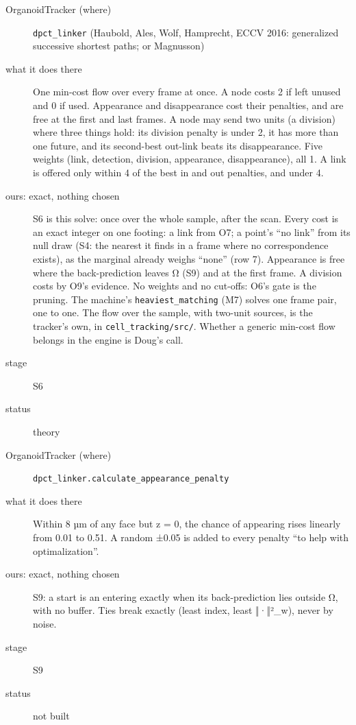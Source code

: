 \begin{description}
\item[{OrganoidTracker (where)}] \texttt{dpct\_\allowbreak{}linker} (Haubold, Ales, Wolf, Hamprecht, ECCV 2016: generalized successive shortest paths; or Magnusson)
\item[{what it does there}] One min-cost flow over every frame at once. A node costs 2 if left unused and 0 if used. Appearance and disappearance cost their penalties, and are free at the first and last frames. A node may send two units (a division) where three things hold: its division penalty is under 2, it has more than one future, and its second-best out-link beats its disappearance. Five weights (link, detection, division, appearance, disappearance), all 1. A link is offered only within 4 of the best in and out penalties, and under 4.
\item[{ours: exact, nothing chosen}] S6 is this solve: once over the whole sample, after the scan. Every cost is an exact integer on one footing: a link from O7; a point's “no link” from its null draw (S4: the nearest it finds in a frame where no correspondence exists), as the marginal already weighs “none” (row 7). Appearance is free where the back-prediction leaves Ω (S9) and at the first frame. A division costs by O9's evidence. No weights and no cut-offs: O6's gate is the pruning. The machine's \texttt{heaviest\_\allowbreak{}matching} (M7) solves one frame pair, one to one. The flow over the sample, with two-unit sources, is the tracker's own, in \texttt{cell\_\allowbreak{}tracking/\allowbreak{}src/\allowbreak{}}. Whether a generic min-cost flow belongs in the engine is Doug's call.
\item[{stage}] S6
\item[{status}] theory
\end{description}

\begin{description}
\item[{OrganoidTracker (where)}] \texttt{dpct\_\allowbreak{}linker.\allowbreak{}calculate\_\allowbreak{}appearance\_\allowbreak{}penalty}
\item[{what it does there}] Within 8 µm of any face but z = 0, the chance of appearing rises linearly from 0.01 to 0.51. A random ±0.05 is added to every penalty “to help with optimalization”.
\item[{ours: exact, nothing chosen}] S9: a start is an entering exactly when its back-prediction lies outside Ω, with no buffer. Ties break exactly (least index, least ‖·‖²\_\allowbreak{}w), never by noise.
\item[{stage}] S9
\item[{status}] not built
\end{description}

